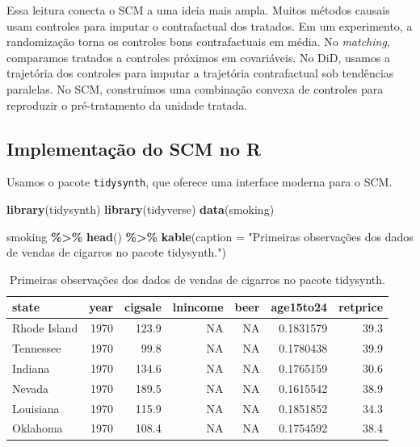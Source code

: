 \documentclass[
]{article}
\newenvironment{Shaded}{\begin{snugshade}}{\end{snugshade}}
\newcommand{\AttributeTok}[1]{\textcolor[rgb]{0.13,0.29,0.53}{#1}}
\newcommand{\FunctionTok}[1]{\textcolor[rgb]{0.13,0.29,0.53}{\textbf{#1}}}
\newcommand{\NormalTok}[1]{#1}
\newcommand{\SpecialCharTok}[1]{\textcolor[rgb]{0.81,0.36,0.00}{\textbf{#1}}}
\newcommand{\StringTok}[1]{\textcolor[rgb]{0.31,0.60,0.02}{#1}}
\begin{document}
Essa leitura conecta o SCM a uma ideia mais ampla. Muitos métodos causais usam controles para imputar o contrafactual dos tratados. Em um experimento, a randomização torna os controles bons contrafactuais em média. No \emph{matching}, comparamos tratados a controles próximos em covariáveis. No DiD, usamos a trajetória dos controles para imputar a trajetória contrafactual sob tendências paralelas. No SCM, construímos uma combinação convexa de controles para reproduzir o pré-tratamento da unidade tratada.

\subsection{Implementação do SCM no R}\label{implementauxe7uxe3o-do-scm-no-r}

Usamos o pacote \texttt{tidysynth}, que oferece uma interface moderna para o SCM.

\begin{Shaded}
\begin{Highlighting}[]
\FunctionTok{library}\NormalTok{(tidysynth)}
\FunctionTok{library}\NormalTok{(tidyverse)}
\FunctionTok{data}\NormalTok{(smoking)}

\NormalTok{smoking }\SpecialCharTok{\%\textgreater{}\%}
  \FunctionTok{head}\NormalTok{() }\SpecialCharTok{\%\textgreater{}\%}
  \FunctionTok{kable}\NormalTok{(}\AttributeTok{caption =} \StringTok{"Primeiras observações dos dados de vendas de cigarros no pacote tidysynth."}\NormalTok{)}
\end{Highlighting}
\end{Shaded}

\begin{table}

\caption{\label{tab:cigarro-tidysynth}Primeiras observações dos dados de vendas de cigarros no pacote tidysynth.}
\centering
\begin{tabular}[t]{l|r|r|r|r|r|r}
\hline
state & year & cigsale & lnincome & beer & age15to24 & retprice\\
\hline
Rhode Island & 1970 & 123.9 & NA & NA & 0.1831579 & 39.3\\
\hline
Tennessee & 1970 & 99.8 & NA & NA & 0.1780438 & 39.9\\
\hline
Indiana & 1970 & 134.6 & NA & NA & 0.1765159 & 30.6\\
\hline
Nevada & 1970 & 189.5 & NA & NA & 0.1615542 & 38.9\\
\hline
Louisiana & 1970 & 115.9 & NA & NA & 0.1851852 & 34.3\\
\hline
Oklahoma & 1970 & 108.4 & NA & NA & 0.1754592 & 38.4\\
\hline
\end{tabular}
\end{table}
\end{document}
